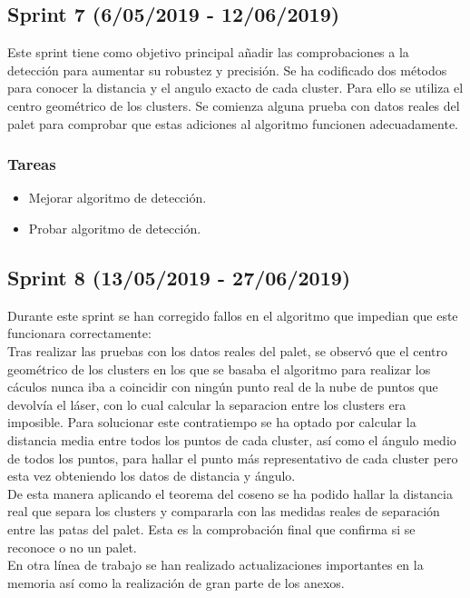 

\subsection{Sprint 7 (6/05/2019 - 12/06/2019)}
Este sprint tiene como objetivo principal añadir las comprobaciones a la detección para aumentar su robustez y precisión. Se ha codificado dos métodos para conocer la distancia y el angulo exacto de cada cluster. Para ello se utiliza el centro geométrico de los clusters. Se comienza alguna prueba con datos reales del palet para comprobar que estas adiciones al algoritmo funcionen adecuadamente.




\subsubsection{Tareas}
\begin{itemize}
\item Mejorar algoritmo de detección.
\item Probar algoritmo de detección.


\end{itemize}



\subsection{Sprint 8 (13/05/2019 - 27/06/2019)}
Durante este sprint se han corregido fallos en el algoritmo que impedian que este funcionara correctamente:\\ Tras realizar las pruebas con los datos reales del palet, se observó que el centro geométrico de los clusters en los que se basaba el algoritmo para realizar los cáculos nunca iba a coincidir con ningún punto real de la nube de puntos que devolvía el láser, con lo cual calcular la separacion entre los clusters era imposible. Para solucionar este contratiempo se ha optado por calcular la distancia media entre todos los puntos de cada cluster, así como el ángulo medio de todos los puntos, para hallar el punto más representativo de cada cluster pero esta vez obteniendo los datos de distancia y ángulo.\\ De esta manera aplicando el teorema del coseno se ha podido hallar la distancia real que separa los clusters y compararla con las medidas reales de separación entre las patas del palet. Esta es la comprobación final que confirma si se reconoce o no un palet.\\ En otra línea de trabajo se han realizado actualizaciones importantes en la memoria así como la realización de gran parte de los anexos.




